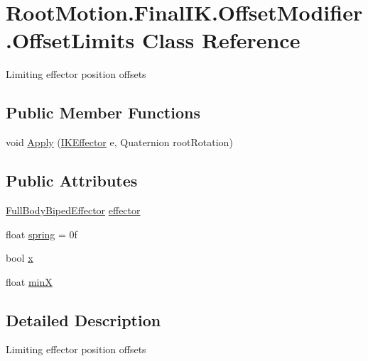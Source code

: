 \hypertarget{class_root_motion_1_1_final_i_k_1_1_offset_modifier_1_1_offset_limits}{}\section{Root\+Motion.\+Final\+I\+K.\+Offset\+Modifier.\+Offset\+Limits Class Reference}
\label{class_root_motion_1_1_final_i_k_1_1_offset_modifier_1_1_offset_limits}


Limiting effector position offsets  


\subsection*{Public Member Functions}
\begin{DoxyCompactItemize}
\item 
void \mbox{\hyperlink{class_root_motion_1_1_final_i_k_1_1_offset_modifier_1_1_offset_limits_a55bee1fe425825e8a47afe9e46be08d8}{Apply}} (\mbox{\hyperlink{class_root_motion_1_1_final_i_k_1_1_i_k_effector}{I\+K\+Effector}} e, Quaternion root\+Rotation)
\end{DoxyCompactItemize}
\subsection*{Public Attributes}
\begin{DoxyCompactItemize}
\item 
\mbox{\hyperlink{namespace_root_motion_1_1_final_i_k_ae0dd2058c7667b6f132c11a6b860c14a}{Full\+Body\+Biped\+Effector}} \mbox{\hyperlink{class_root_motion_1_1_final_i_k_1_1_offset_modifier_1_1_offset_limits_a28b47dcc99eacc732be565a170144daa}{effector}}
\item 
float \mbox{\hyperlink{class_root_motion_1_1_final_i_k_1_1_offset_modifier_1_1_offset_limits_ab45087a8a4142e01345e41dc3cc0a033}{spring}} = 0f
\item 
bool \mbox{\hyperlink{class_root_motion_1_1_final_i_k_1_1_offset_modifier_1_1_offset_limits_a5e452add92179e91107b0cc2af03e639}{x}}
\item 
float \mbox{\hyperlink{class_root_motion_1_1_final_i_k_1_1_offset_modifier_1_1_offset_limits_a0c7f12fee445b3422fd81cff4e25c41e}{minX}}
\end{DoxyCompactItemize}


\subsection{Detailed Description}
Limiting effector position offsets 



